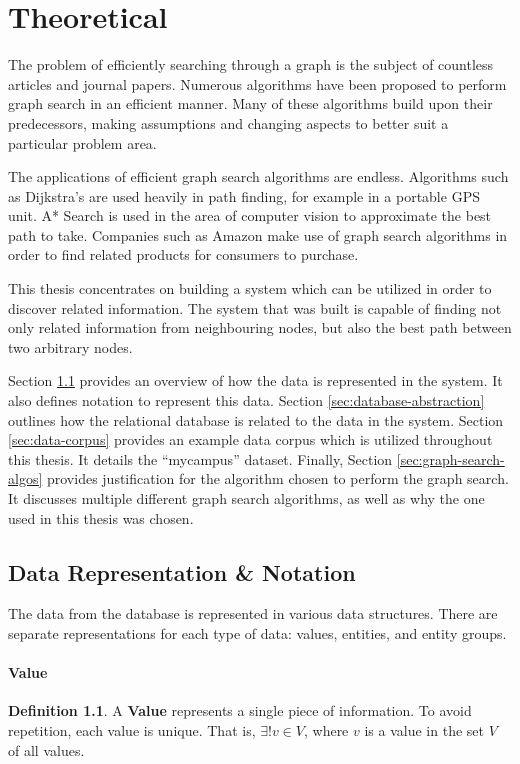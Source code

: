 \documentclass[12pt,letterpaper,oneside,notitlepage]{report}
\theoremstyle{definition}
\newtheorem{defn}{Definition}
\begin{document}
	\chapter{Theoretical}
		The problem of efficiently searching through a graph is the subject of countless articles and journal papers.  Numerous algorithms have been proposed to perform graph search in an efficient manner.  Many of these algorithms build upon their predecessors, making assumptions and changing aspects to better suit a particular problem area.
		
		The applications of efficient graph search algorithms are endless.  Algorithms such as Dijkstra's are used heavily in path finding, for example in a portable GPS unit.  A* Search is used in the area of computer vision to approximate the best path to take.  Companies such as Amazon make use of graph search algorithms in order to find related products for consumers to purchase.
		
		This thesis concentrates on building a system which can be utilized in order to discover related information.  The system that was built is capable of finding not only related information from neighbouring nodes, but also the best path between two arbitrary nodes.
		
		Section \ref{sec:data-rep-and-notation} provides an overview of how the data is represented in the system.  It also defines notation to represent this data.  Section \ref{sec:database-abstraction} outlines how the relational database is related to the data in the system.  Section \ref{sec:data-corpus} provides an example data corpus which is utilized throughout this thesis.  It details the ``mycampus'' dataset.  Finally, Section \ref{sec:graph-search-algos} provides justification for the algorithm chosen to perform the graph search.  It discusses multiple different graph search algorithms, as well as why the one used in this thesis was chosen.
		
		\section{Data Representation \& Notation}
		\label{sec:data-rep-and-notation}
			The data from the database is represented in various data structures.  There are separate representations for each type of data:  values, entities, and entity groups.

				\subsubsection{Value}
					\begin{defn}
						A \textbf{Value} represents a single piece of information.  To avoid repetition, each value is unique.  That is, $\exists! v \in V$, where $v$ is a value in the set $V$ of all values.
					\end{defn}
\end{document}
